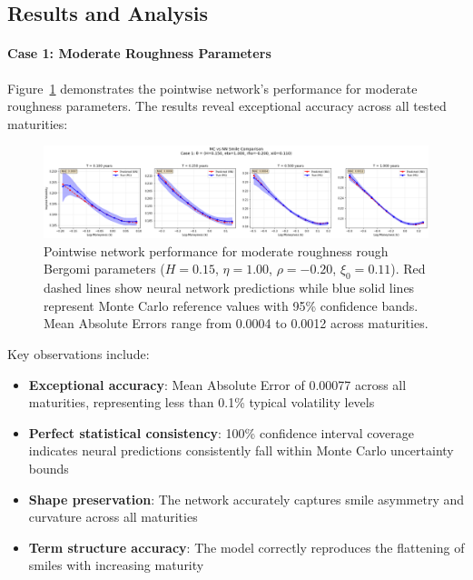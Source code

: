 	\subsection{Results and Analysis}
	
	\paragraph{Case 1: Moderate Roughness Parameters}
	
	Figure~\ref{fig:pointwise-case1} demonstrates the pointwise network's performance for moderate roughness parameters. The results reveal exceptional accuracy across all tested maturities:
	
	\begin{figure}[ht]
		\centering
		\includegraphics[width=\textwidth]{../images/pointwise_case1_comparison.png}
		\caption{Pointwise network performance for moderate roughness rough Bergomi parameters ($H = 0.15$, $\eta = 1.00$, $\rho = -0.20$, $\xi_0 = 0.11$). Red dashed lines show neural network predictions while blue solid lines represent Monte Carlo reference values with 95\% confidence bands. Mean Absolute Errors range from 0.0004 to 0.0012 across maturities.}
		\label{fig:pointwise-case1}
	\end{figure}
	
	Key observations include:
	
	\begin{itemize}[nosep]
		\item \textbf{Exceptional accuracy}: Mean Absolute Error of 0.00077 across all maturities, representing less than 0.1\% typical volatility levels
		\item \textbf{Perfect statistical consistency}: 100\% confidence interval coverage indicates neural predictions consistently fall within Monte Carlo uncertainty bounds
		\item \textbf{Shape preservation}: The network accurately captures smile asymmetry and curvature across all maturities
		\item \textbf{Term structure accuracy}: The model correctly reproduces the flattening of smiles with increasing maturity
	\end{itemize}
				
